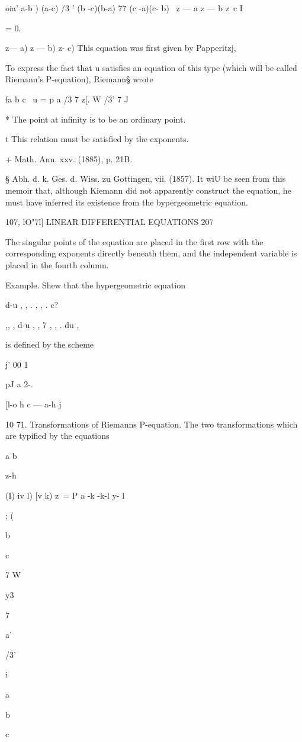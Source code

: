   oia' a-b ) (a-c) /3 ' (b -c)(b-a) 77 (c -a)(c- b) \ z — a z — b z~c
I

= 0.

 z— a) z — b) z- c) This equation was first given by Papperitzj,

To express the fact that u satisfies an equation of this type (which
will be called Riemann's P-equation), Riemann§ wrote

fa b c \ u = p a /3 7 z[. W /3' 7 J

* The point at infinity is to be an ordinary point.

t This relation must be satisfied by the exponents.

+ Math. Ann. xxv. (1885), p. 21B.

§ Abh. d. k. Ges. d. Wiss. zu Gottingen, vii. (1857). It wiU be seen
from this memoir that, although Kiemann did not apparently construct
the equation, he must have inferred its existence from the
bypergeometric equation.

107, lO"7l] LINEAR DIFFERENTIAL EQUATIONS 207

The singular points of the equation are placed in the first row with
the corresponding exponents directly beneath them, and the independent
variable is placed in the fourth column.

Example. Shew that the hypergeometric equation

d-u , , . , , . c?

,, , d-u , , 7 , , . du ,

is defined by the scheme

j' 00 1 \

pJ a 2-.

[l-o h c — a-h j

10 71. Transformations of Riemanns P-equation. The two transformations
which are typified by the equations

a b

z-h

(I) iv l) [v k) z\ = P a -k -k-l y- l

; (

b

c

7 W

y3

7

a'

/3'

i

a

b

c

